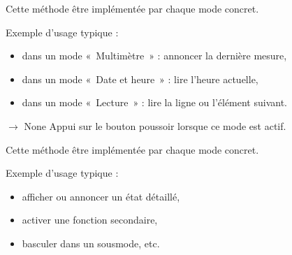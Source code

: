 \documentclass[letterpaper,10pt,french]{sphinxmanual}
\begin{document}
\begin{fulllineitems}
\begin{fulllineitems}
\sphinxAtStartPar
Cette méthode  être implémentée par chaque mode concret.

\sphinxAtStartPar
Exemple d’usage typique :
\begin{itemize}
\item {} 
\sphinxAtStartPar
dans un mode « Multimètre » : annoncer la dernière mesure,

\item {} 
\sphinxAtStartPar
dans un mode « Date et heure » : lire l’heure actuelle,

\item {} 
\sphinxAtStartPar
dans un mode « Lecture » : lire la ligne ou l’élément suivant.

\end{itemize}

\end{fulllineitems}


\begin{fulllineitems}
\label{\detokenize{api/core:core.mode_base.Mode.on_long_press}}
\pysigstartsignatures
\pysiglinewithargsret
{}
{}
{{ $\rightarrow$ None}}
\pysigstopsignatures
\sphinxAtStartPar
Appui  sur le bouton poussoir lorsque ce mode est actif.

\sphinxAtStartPar
Cette méthode  être implémentée par chaque mode concret.

\sphinxAtStartPar
Exemple d’usage typique :
\begin{itemize}
\item {} 
\sphinxAtStartPar
afficher ou annoncer un état détaillé,

\item {} 
\sphinxAtStartPar
activer une fonction secondaire,

\item {} 
\sphinxAtStartPar
basculer dans un sous\sphinxhyphen{}mode, etc.

\end{itemize}

\end{fulllineitems}



\end{fulllineitems}
\end{document}
